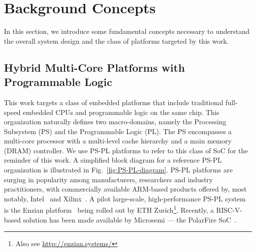 \section{Background Concepts}

In this section, we introduce some fundamental concepts necessary to
understand the overall system design and the class of platforms
targeted by this work.

\subsection{Hybrid Multi-Core Platforms with Programmable Logic}
This work targets a class of embedded platforms that include
traditional full-speed embedded CPUs and programmable logic on the
same chip. This organization naturally defines two macro-domains,
namely the Processing Subsystem (PS) and the Programmable Logic
(PL). The PS encompasses a multi-core processor with a multi-level
cache hierarchy and a main memory (DRAM) controller. We use PS-PL
platforms to refer to this class of SoC for the reminder of this
work. A simplified block diagram for a reference PS-PL organization is
illustrated in Fig.~\ref{fig:PS-PL-diagram}. PS-PL platforms are
surging in popularity among manufacturers, researchers and industry
practitioners, with commercially available ARM-based products offered
by, most notably, Intel~\cite{stratix10} and
Xilinx~\cite{ultrascale+}. A pilot large-scale, high-performance PS-PL
system is the Enzian platform~\cite{enzian20} being rolled out by ETH
Zurich\footnote{Also see \url{http://enzian.systems/}}. Recently, a
RISC-V-based solution has been made available by Microsemi --- the
PolarFire SoC~\cite{icikle_kit}. 

